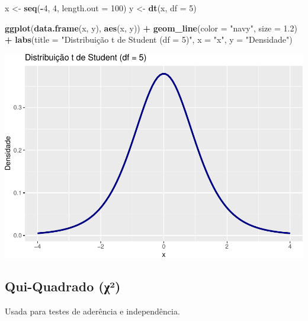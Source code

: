 \documentclass[
]{book}
\newenvironment{Shaded}{\begin{snugshade}}{\end{snugshade}}
\newcommand{\AttributeTok}[1]{\textcolor[rgb]{0.13,0.29,0.53}{#1}}
\newcommand{\DecValTok}[1]{\textcolor[rgb]{0.00,0.00,0.81}{#1}}
\newcommand{\FloatTok}[1]{\textcolor[rgb]{0.00,0.00,0.81}{#1}}
\newcommand{\FunctionTok}[1]{\textcolor[rgb]{0.13,0.29,0.53}{\textbf{#1}}}
\newcommand{\NormalTok}[1]{#1}
\newcommand{\OtherTok}[1]{\textcolor[rgb]{0.56,0.35,0.01}{#1}}
\newcommand{\SpecialCharTok}[1]{\textcolor[rgb]{0.81,0.36,0.00}{\textbf{#1}}}
\newcommand{\StringTok}[1]{\textcolor[rgb]{0.31,0.60,0.02}{#1}}
\begin{document}
\begin{Shaded}
\begin{Highlighting}[]
\NormalTok{x }\OtherTok{\textless{}{-}} \FunctionTok{seq}\NormalTok{(}\SpecialCharTok{{-}}\DecValTok{4}\NormalTok{, }\DecValTok{4}\NormalTok{, }\AttributeTok{length.out =} \DecValTok{100}\NormalTok{)}
\NormalTok{y }\OtherTok{\textless{}{-}} \FunctionTok{dt}\NormalTok{(x, }\AttributeTok{df =} \DecValTok{5}\NormalTok{)}

\FunctionTok{ggplot}\NormalTok{(}\FunctionTok{data.frame}\NormalTok{(x, y), }\FunctionTok{aes}\NormalTok{(x, y)) }\SpecialCharTok{+}
  \FunctionTok{geom\_line}\NormalTok{(}\AttributeTok{color =} \StringTok{"navy"}\NormalTok{, }\AttributeTok{size =} \FloatTok{1.2}\NormalTok{) }\SpecialCharTok{+}
  \FunctionTok{labs}\NormalTok{(}\AttributeTok{title =} \StringTok{"Distribuição t de Student (df = 5)"}\NormalTok{, }\AttributeTok{x =} \StringTok{"x"}\NormalTok{, }\AttributeTok{y =} \StringTok{"Densidade"}\NormalTok{)}
\end{Highlighting}
\end{Shaded}

\includegraphics{LivroEstatisticaR_files/figure-latex/studentDist-1.pdf}

\subsection{Qui-Quadrado (χ²)}\label{qui-quadrado-ux3c7uxb2}

Usada para testes de aderência e independência.
\end{document}
